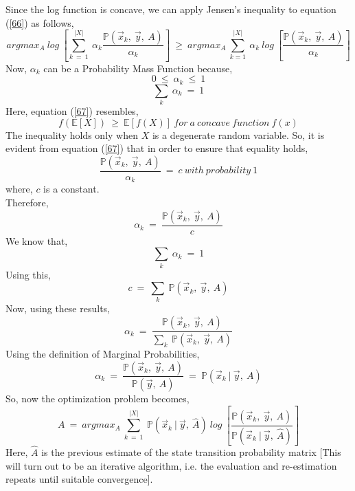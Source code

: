 \documentclass[12pt, draftcls, onecolumn]{IEEEtran}
\begin{document}
Since the log function is concave, we can apply Jensen's inequality to equation (\ref{66}) as follows,
\begin{equation}\label{67}
    argmax_{A}\ log\ [\sum_{k\ =\ 1}^{|X|}\ \alpha_k \frac{\mathbb{P}(\vec{x}_k,\ \vec{y},\ A)}{\alpha_k}]\ \geq\ argmax_A\ \sum_{k=1}^{|X|}\ \alpha_k\ log\ [\frac{\mathbb{P}(\vec{x}_k,\ \vec{y},\ A)}{\alpha_k}]
\end{equation}
Now, $\alpha_k$ can be a Probability Mass Function because,
\[0\ \leq\ \alpha_k\ \leq\ 1\]
\[\sum_{k}\ \alpha_k\ =\ 1\]
Here, equation (\ref{67}) resembles,
\[f(\mathbb{E}[X])\ \geq\ \mathbb{E}[f(X)]\ for\ a\ concave\ function\ f(x)\]
The inequality holds only when $X$ is a degenerate random variable.
So, it is evident from equation (\ref{67}) that in order to ensure that equality holds, 
\begin{equation}\label{68}
    \frac{\mathbb{P}(\vec{x}_k,\ \vec{y},\ A)}{\alpha_k}\ =\ c\ with\ probability\ 1
\end{equation}
where, $c$ is a constant.
\\Therefore,
\begin{equation}\label{69}
    \alpha_k\ =\ \frac{\mathbb{P}(\vec{x}_k,\ \vec{y},\ A)}{c}
\end{equation}
We know that,
\[\sum_k\ \alpha_k\ =\ 1\]
Using this,
\begin{equation}\label{70}
    c\ =\ \sum_k\ \mathbb{P}(\vec{x}_k,\ \vec{y},\ A)
\end{equation}
Now, using these results,
\begin{equation}\label{71}
    \alpha_k\ =\ \frac{\mathbb{P}(\vec{x}_k,\ \vec{y},\ A)}{\sum_k\ \mathbb{P}(\vec{x}_k,\ \vec{y},\ A)}
\end{equation}
Using the definition of Marginal Probabilities,
\begin{equation}\label{72}
    \alpha_k\ =\ \frac{\mathbb{P}(\vec{x}_k,\ \vec{y},\ A)}{\mathbb{P}(\vec{y},\ A)}\ =\ \mathbb{P}(\vec{x}_k\ |\ \vec{y},\ A)
\end{equation}
So, now the optimization problem becomes,
\begin{equation}\label{73}
    A\ =\ argmax_A\ \sum_{k\ =\ 1}^{|X|}\ \mathbb{P}(\vec{x}_k\ |\ \vec{y},\ \hat{A})\ log\ [\frac{\mathbb{P}(\vec{x}_k,\ \vec{y},\ A)}{\mathbb{P}(\vec{x}_k\ |\ \vec{y},\ \hat{A})}]
\end{equation}
Here, $\hat{A}$ is the previous estimate of the state transition probability matrix [This will turn out to be an iterative algorithm, i.e. the evaluation and re-estimation repeats until suitable convergence].
\end{document}
